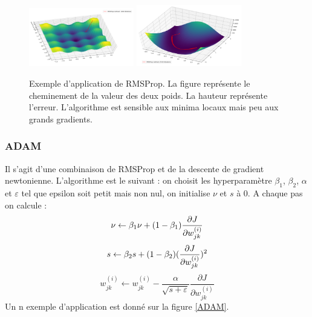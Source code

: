 \begin{figure}[!h]
\centering
\includegraphics[width=130pt]{"images/MLP/RMSProp"}
\hspace*{10mm}
\includegraphics[width=130pt]{"images/MLP/RMSPropPropre"}
\caption{Exemple d'application de RMSProp. La figure représente le cheminement de la valeur des deux poids. La hauteur représente l'erreur. L'algorithme est sensible aux minima locaux mais peu aux grands gradients.}
\label{RMSProp}
\end{figure}

\subsubsection{ADAM}
Il s'agit d'une combinaison de RMSProp et de la descente de gradient newtonienne.
L'algorithme est le suivant : on choisit les hyperparamètre $\beta_1$, $\beta_2$,  $\alpha$ et $\varepsilon$ tel que epsilon soit petit mais non nul, on initialise $\nu$ et $s$ à 0.
A chaque pas on calcule :
\begin{displaymath}
\nu \leftarrow \beta_1 \nu + (1-\beta_1) \frac{\partial J}{\partial w_{jk}^{(i)}} \\
\end{displaymath}
\begin{displaymath}
s \leftarrow \beta_2 s + (1-\beta_2) (\frac{\partial J}{\partial w_{jk}^{(i)}})^2 \\
\end{displaymath}
\begin{displaymath}
w_{jk}^{(i)} \leftarrow w_{jk}^{(i)} - \frac{\alpha}{\sqrt{s+\varepsilon}}\frac{\partial J}{\partial w_{jk}^{(i)}}
\end{displaymath}
Un n exemple d'application est donné sur la figure \ref{ADAM}.

